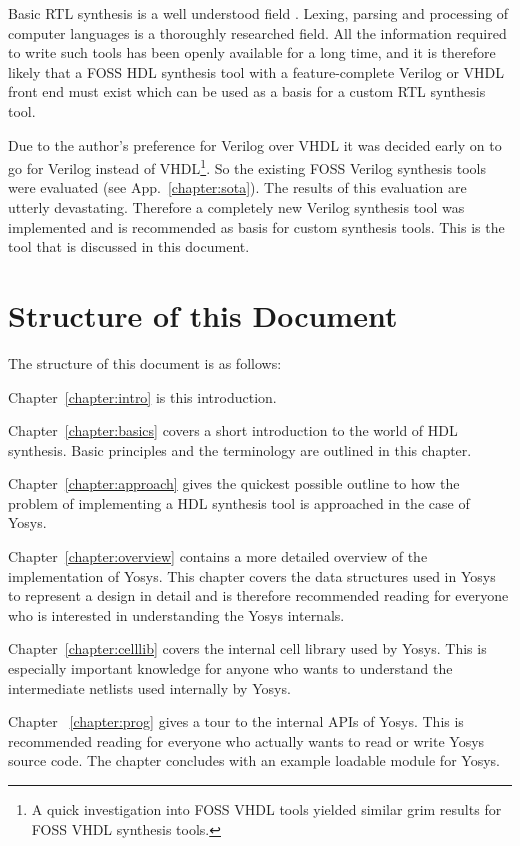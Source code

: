 Basic RTL synthesis is a well understood field \cite{LogicSynthesis}. Lexing,
parsing and processing of computer languages \cite{Dragonbook} is a thoroughly
researched field. All the information required to write such tools has been openly
available for a long time, and it is therefore likely that a FOSS HDL synthesis tool
with a feature-complete Verilog or VHDL front end must exist which can be used as a basis for a custom RTL synthesis tool.

Due to the author's preference for Verilog over VHDL it was decided early
on to go for Verilog instead of VHDL\footnote{A quick investigation into FOSS
VHDL tools yielded similar grim results for FOSS VHDL synthesis tools.}.
So the existing FOSS Verilog synthesis tools were evaluated (see
App.~\ref{chapter:sota}).  The results of this evaluation are utterly
devastating. Therefore a completely new Verilog synthesis tool was implemented
and is recommended as basis for custom synthesis tools. This is the tool that
is discussed in this document.

\section{Structure of this Document}

The structure of this document is as follows:

Chapter~\ref{chapter:intro} is this introduction.

Chapter~\ref{chapter:basics} covers a short introduction to the world of HDL
synthesis. Basic principles and the terminology are outlined in this chapter.

Chapter~\ref{chapter:approach} gives the quickest possible outline to how the
problem of implementing a HDL synthesis tool is approached in the case of
Yosys.

Chapter~\ref{chapter:overview} contains a more detailed overview of the
implementation of Yosys. This chapter covers the data structures used in 
Yosys to represent a design in detail and is therefore recommended reading
for everyone who is interested in understanding the Yosys internals.

Chapter~\ref{chapter:celllib} covers the internal cell library used by Yosys.
This is especially important knowledge for anyone who wants to understand the
intermediate netlists used internally by Yosys.

Chapter~ \ref{chapter:prog} gives a tour to the internal APIs of Yosys. This
is recommended reading for everyone who actually wants to read or write
Yosys source code. The chapter concludes with an example loadable module
for Yosys.

